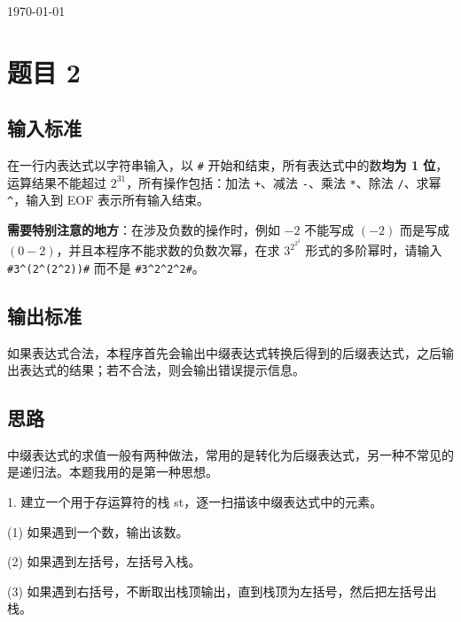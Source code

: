 \documentclass[cs4size,a4paper]{ctexart}
\begin{document}
\begin{titlepage}
\begin{center}
			
			\vfill
			
			{\large \today}
			
		\end{center}
		
	\end{titlepage}

	\iffalse
	\tableofcontents
	\thispagestyle{empty}
	\clearpage
	\noindent
	\setmainfont{Courier New Bold}
	\setcounter{page}{1}


	\section{题目 2}
	
	\subsection{输入标准}
	
	在一行内表达式以字符串输入，以 \verb|#| 开始和结束，所有表达式中的数\textbf{均为 1 位}，运算结果不能超过 $2^{31}$，所有操作包括：加法 \lstinline|+|、减法 \verb|-|、乘法 \verb|*|、除法 \verb|/|、求幂 \verb|^|，输入到 EOF 表示所有输入结束。
	
	\textbf{需要特别注意的地方}：在涉及负数的操作时，例如 $-2$ 不能写成 $(-2)$ 而是写成 $(0-2)$，并且本程序不能求数的负数次幂，在求 $3^{2^{2^2}}$ 形式的多阶幂时，请输入 \verb|#3^(2^(2^2))#| 而不是 \verb|#3^2^2^2#|。
	
	
	\subsection{输出标准}
	
	如果表达式合法，本程序首先会输出中缀表达式转换后得到的后缀表达式，之后输出表达式的结果；若不合法，则会输出错误提示信息。
	
	\subsection{思路}
	
	中缀表达式的求值一般有两种做法，常用的是转化为后缀表达式，另一种不常见的是递归法。本题我用的是第一种思想。
	
	1. 建立一个用于存运算符的栈 st，逐一扫描该中缀表达式中的元素。
	
	(1) 如果遇到一个数，输出该数。
	
	(2) 如果遇到左括号，左括号入栈。
	
	(3) 如果遇到右括号，不断取出栈顶输出，直到栈顶为左括号，然后把左括号出栈。
	
\end{document}
